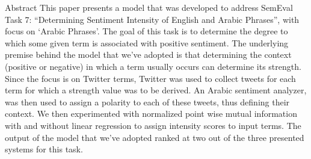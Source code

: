 Abstract This paper presents a model that was developed to address SemEval Task 7: ``Determining Sentiment Intensity of English and Arabic Phrases'', with focus on ‘Arabic Phrases'. The goal of this task is to determine the degree to which some given term is associated with positive sentiment. The underlying premise behind the model that we've adopted is that determining the context (positive or negative) in which a term usually occurs can determine its strength. Since the focus is on Twitter terms, Twitter was used to collect tweets for each term for which a strength value was to be derived. An Arabic sentiment analyzer, was then used to assign a polarity to each of these tweets, thus defining their context. We then experimented with normalized point wise mutual information with and without linear regression to assign intensity scores to input terms.                    The output of the model that we've adopted ranked at two out of the three presented systems for this task.
